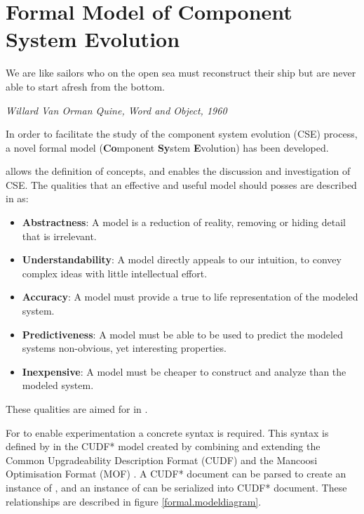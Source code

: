 \chapter{Formal Model of Component System Evolution}
\label{formal}
\epigraph{We are like sailors who on the open sea must reconstruct their ship but are never able to start afresh from the bottom.}
{\textit{Willard Van Orman Quine, Word and Object, 1960}}
In order to facilitate the study of the component system evolution (CSE) process, 
a novel formal model \modelname (\textbf{Co}mponent \textbf{Sy}stem \textbf{E}volution) has been developed.

\modelname allows the definition of concepts, and enables the discussion and investigation of CSE.
The qualities that an effective and useful model should posses are described in \citep{Selic2003} as:
\begin{itemize}
  \item \textbf{Abstractness}: A model is a reduction of reality, removing or hiding detail that is irrelevant.
  \item \textbf{Understandability}: A model directly appeals to our intuition, to convey complex ideas with little intellectual effort.
  \item \textbf{Accuracy}: A model must provide a true to life representation of the modeled system.
  \item \textbf{Predictiveness}: A model must be able to be used to predict the modeled systems non-obvious, yet interesting properties.
  \item \textbf{Inexpensive}: A model must be cheaper to construct and analyze than the modeled system.
\end{itemize}
These qualities are aimed for in \modelname.

For \modelname to enable experimentation a concrete syntax is required.
This syntax is defined by in the CUDF* model created by combining and extending the Common Upgradeability Description Format (CUDF) \citep{treinen2009common} 
and the Mancoosi Optimisation Format (MOF) \citep{abate2011}.
A CUDF* document can be parsed to create an instance of \modelname,
and an instance of \modelname can be serialized into CUDF* document.
These relationships are described in figure \ref{formal.modeldiagram}.

